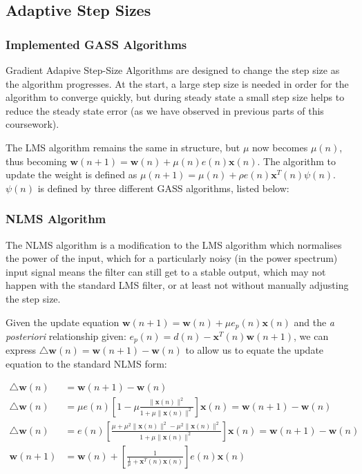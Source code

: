 \documentclass[./main.tex]{subfiles}
\begin{document}
\subsection{Adaptive Step Sizes}

\subsubsection{Implemented GASS Algorithms}
Gradient Adapive Step-Size Algorithms are designed to change the step size as the algorithm progresses. At the start, a large step size is needed in order for the algorithm to converge quickly, but during steady state a small step size helps to reduce the steady state error (as we have observed in previous parts of this coursework).

The LMS algorithm remains the same in structure, but $\mu$ now becomes $\mu(n)$, thus becoming $  \mathbf{w}(n+1) = \mathbf{w}(n) + \mu(n) e(n) \mathbf{x}(n) $. The algorithm to update the weight is defined as $ \mu(n+1) = \mu(n) + \rho e(n) \mathbf{x}^T(n) \psi(n)$. $ \psi(n) $ is defined by three different GASS algorithms, listed below:




\subsubsection{NLMS Algorithm}

The NLMS algorithm is a modification to the LMS algorithm which normalises the power of the input, which for a particularly noisy (in the power spectrum) input signal means the filter can still get to a stable output, which may not happen with the standard LMS filter, or at least not without manually adjusting the step size.

Given the update equation $ \mathbf{w}(n+1) = \mathbf{w}(n) + \mu e_p(n) \mathbf{x}(n) $ and the \textit{a posteriori} relationship given: $  e_p(n) = d(n) - \mathbf{x}^T(n) \mathbf{w}(n+1) $, we can express $ \bigtriangleup \mathbf{w}(n) = \mathbf{w}(n+1) - \mathbf{w}(n) $ to allow us to equate the update equation to the standard NLMS form:

\begin{subequations}
	\begin{align}
	\bigtriangleup \mathbf{w}(n) &= \mathbf{w}(n+1) - \mathbf{w}(n) \\
	\bigtriangleup \mathbf{w}(n) &= \mu e(n) \left[  1 - \mu \frac{\lVert \mathbf{x}(n)\rVert^2}{1 + \mu \lVert \mathbf{x}(n)\rVert^2} \right] \mathbf{x}(n) = \mathbf{w}(n+1) - \mathbf{w}(n) \\
	\bigtriangleup \mathbf{w}(n) &= e(n) \left[ \frac{\mu + \mu^2  \lVert \mathbf{x}(n)\rVert^2 - \mu^2 \lVert \mathbf{x}(n)\rVert^2}{1 + \mu \lVert \mathbf{x}(n)\rVert^2} \right] \mathbf{x}(n) = \mathbf{w}(n+1) - \mathbf{w}(n) \\
	\mathbf{w}(n+1) &= \mathbf{w}(n) + \left[ \frac{1}{\frac{1}{\mu} + \mathbf{x}^T(n)\mathbf{x}(n) } \right] e(n) \mathbf{x}(n)  \label{subeq:3_2_b}
	\end{align}
\end{subequations}
\end{document}
